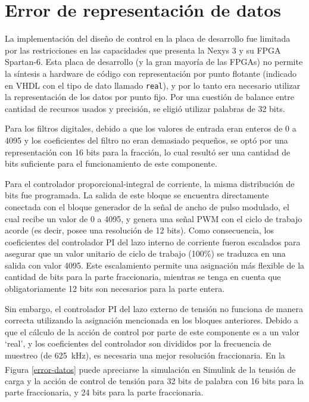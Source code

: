 \chapter{Error de representación de datos}
\label{apendice-error}

La implementación del diseño de control en la placa de desarrollo fue limitada por las restricciones en las capacidades que presenta la Nexys 3 y su FPGA Spartan-6. Esta placa de desarrollo (y la gran mayoría de las FPGAs) no permite la síntesis a hardware de código con representación por punto flotante (indicado en VHDL con el tipo de dato llamado \texttt{real}), y por lo tanto era necesario utilizar la representación de los datos por punto fijo. Por una cuestión de balance entre cantidad de recursos usados y precisión, se eligió utilizar palabras de 32 bits.

Para los filtros digitales, debido a que los valores de entrada eran enteros de 0 a 4095 y los coeficientes del filtro no eran demasiado pequeños, se optó por una representación con 16 bits para la fracción, lo cual resultó ser una cantidad de bits suficiente para el funcionamiento de este componente.

Para el controlador proporcional-integral de corriente, la misma distribución de bits fue programada. La salida de este bloque se encuentra directamente conectada con el bloque generador de la señal de ancho de pulso modulado, el cual recibe un valor de 0 a 4095, y genera una señal PWM con el ciclo de trabajo acorde (es decir, posee una resolución de 12 bits). Como consecuencia, los coeficientes del controlador PI del lazo interno de corriente fueron escalados para asegurar que un valor unitario de ciclo de trabajo (100\%) se traduzca en una salida con valor 4095. Este escalamiento permite una asignación más flexible de la cantidad de bits para la parte fraccionaria, mientras se tenga en cuenta que obligatoriamente 12 bits son necesarios para la parte entera.

Sin embargo, el controlador PI del lazo externo de tensión no funciona de manera correcta utilizando la asignación mencionada en los bloques anteriores. Debido a que el cálculo de la acción de control por parte de este componente es a un valor `real', y los coeficientes del controlador son divididos por la frecuencia de muestreo (de \SI{625}{\kilo\hertz}), es necesaria una mejor resolución fraccionaria. En la Figura \ref{error-datos} puede apreciarse la simulación en Simulink\textsuperscript\textregistered\hspace{0.6pt} de la tensión de carga y la acción de control de tensión para 32 bits de palabra con 16 bits para la parte fraccionaria, y 24 bits para la parte fraccionaria.

